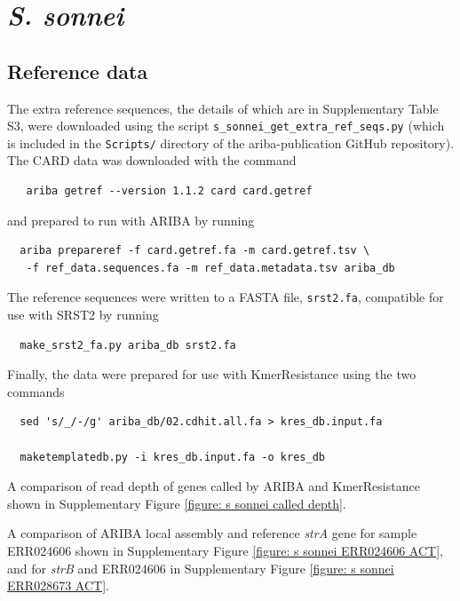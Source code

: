 \documentclass[11pt, a4paper]{article}
\begin{document}
\clearpage

\section{\emph{S. sonnei}}

\subsection{Reference data}
The extra reference sequences, the details of which are in
Supplementary Table S3,  were downloaded using the script
\verb+s_sonnei_get_extra_ref_seqs.py+ (which is included in the
\texttt{Scripts/} directory of the ariba-publication GitHub repository).
The CARD data was downloaded
with the command
\begin{verbatim}
   ariba getref --version 1.1.2 card card.getref
\end{verbatim}
and prepared to run with ARIBA by running
\begin{verbatim}
  ariba prepareref -f card.getref.fa -m card.getref.tsv \
   -f ref_data.sequences.fa -m ref_data.metadata.tsv ariba_db
\end{verbatim}
The reference sequences were written to a FASTA file,
\verb+srst2.fa+, compatible
for use with SRST2 by running
\begin{verbatim}
  make_srst2_fa.py ariba_db srst2.fa
\end{verbatim}
Finally, the data were prepared for use with KmerResistance using
the two commands
\begin{verbatim}
  sed 's/_/-/g' ariba_db/02.cdhit.all.fa > kres_db.input.fa

  maketemplatedb.py -i kres_db.input.fa -o kres_db
\end{verbatim}


A comparison of read depth of genes called by ARIBA and KmerResistance
shown in Supplementary Figure \ref{figure: s sonnei called depth}.

A comparison of ARIBA local assembly and reference \emph{strA} gene for sample
ERR024606 shown in Supplementary Figure \ref{figure: s sonnei ERR024606 ACT}, and for
\emph{strB} and ERR024606 in Supplementary Figure \ref{figure: s sonnei ERR028673 ACT}.
\end{document}
